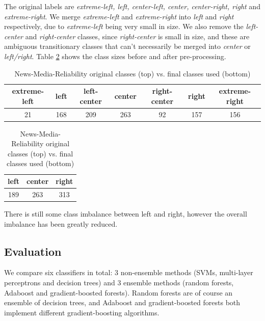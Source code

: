The original labels are \textit{extreme-left, left, center-left, center, center-right, right} and \textit{extreme-right}. We merge \textit{extreme-left} and \textit{extreme-right} into \textit{left} and \textit{right} respectively, due to \textit{extreme-left} being very small in size. We also remove the \textit{left-center} and \textit{right-center} classes, since \textit{right-center} is small in size, and these are ambiguous transitionary classes that can't necessarily be merged into \textit{center} or \textit{left/right}. Table \ref{tab:nmr-class-balancing} shows the class sizes before and after pre-processing.

\begin{table}[h]
    \begin{center}
        \begin{tabular}{|c|c|c|c|c|c|c|}
            \hline
            extreme-left & left & left-center & center & right-center & right & extreme-right \\
            \hline
            21 & 168 & 209 & 263 & 92 & 157 & 156 \\
            \hline
        \end{tabular}
    \end{center} \vspace{5pt}
    \begin{center}
        \begin{tabular}{|c|c|c|}
            \hline
            left & center & right \\
            \hline
            189 & 263 & 313 \\
            \hline
        \end{tabular}
    \end{center}
    \caption{News-Media-Reliability original classes (top) vs. final classes used (bottom)}
    \label{tab:nmr-class-balancing}
\end{table}

There is still some class imbalance between left and right, however the overall imbalance has been greatly reduced.

\subsection{Evaluation}

We compare six classifiers in total: 3 non-ensemble methods (SVMs, multi-layer perceptrons and decision trees) and 3 ensemble methods (random forests, Adaboost and gradient-boosted forests). Random forests are of course an ensemble of decision trees, and Adaboost and gradient-boosted forests both implement different gradient-boosting algorithms.

